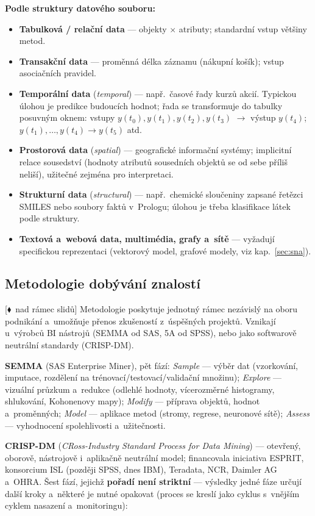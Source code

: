 \documentclass[11pt,a4paper]{article}
\theoremstyle{definition}
\newcommand{\mimo}{\textcolor{markcol}{\textsf{\footnotesize[$\blacklozenge$~nad rámec slidů]}}}
\begin{document}
\textbf{Podle struktury datového souboru:}
\begin{itemize}
\item \textbf{Tabulková / relační data} --- objekty $\times$ atributy; standardní vstup
      většiny metod.
\item \textbf{Transakční data} --- proměnná délka záznamu (nákupní košík); vstup asociačních
      pravidel.
\item \textbf{Temporální data} (\emph{temporal}) --- např.\ časové řady kurzů akcií.
      Typickou úlohou je predikce budoucích hodnot; řada se transformuje do tabulky
      posuvným oknem: vstupy $y(t_0),y(t_1),y(t_2),y(t_3)$ $\to$ výstup $y(t_4)$;
      $y(t_1),\dots,y(t_4)\to y(t_5)$ atd.
\item \textbf{Prostorová data} (\emph{spatial}) --- geografické informační systémy;
      implicitní relace sousedství (hodnoty atributů sousedních objektů se od sebe příliš
      neliší), užitečné zejména pro interpretaci.
\item \textbf{Strukturní data} (\emph{structural}) --- např.\ chemické sloučeniny zapsané
      řetězci SMILES nebo soubory faktů v~Prologu; úlohou je třeba klasifikace látek podle
      struktury.
\item \textbf{Textová a~webová data, multimédia, grafy a~sítě} --- vyžadují specifickou
      reprezentaci (vektorový model, grafové modely, viz kap.~\ref{sec:sna}).
\end{itemize}

\subsection{Metodologie dobývání znalostí}
\label{ssec:metodologie}

\mimo{} Metodologie poskytuje jednotný rámec nezávislý na oboru podnikání a~umožňuje přenos
zkušeností z~úspěšných projektů. Vznikají u~výrobců BI nástrojů (SEMMA od SAS, 5A od SPSS),
nebo jako softwarově neutrální standardy (CRISP-DM).

\textbf{SEMMA} (SAS Enterprise Miner), pět fází: \emph{Sample} --- výběr dat (vzorkování,
imputace, rozdělení na trénovací/testovací/validační množinu); \emph{Explore} --- vizuální
průzkum a~redukce (odlehlé hodnoty, vícerozměrné histogramy, shlukování, Kohonenovy mapy);
\emph{Modify} --- příprava objektů, hodnot a~proměnných; \emph{Model} --- aplikace metod
(stromy, regrese, neuronové sítě); \emph{Assess} --- vyhodnocení spolehlivosti a~užitečnosti.

\textbf{CRISP-DM} (\emph{CRoss-Industry Standard Process for Data Mining}) --- otevřený,
oborově, nástrojově i~aplikačně neutrální model; financovala iniciativa ESPRIT, konsorcium ISL
(později SPSS, dnes IBM), Teradata, NCR, Daimler AG a~OHRA. Šest fází, jejichž \textbf{pořadí
není striktní} --- výsledky jedné fáze určují další kroky a~některé je nutné opakovat (proces se
kreslí jako cyklus s~vnějším cyklem nasazení a~monitoringu):
\end{document}
